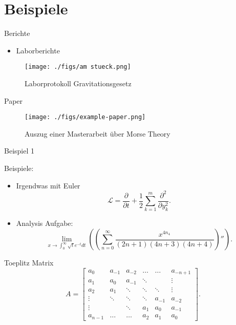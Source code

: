 \section{Beispiele}
\begin{frame}{Berichte}
    \begin{itemize}
        \item Laborberichte 
    \end{itemize}
    \begin{figure}[htpb]
        \centering
        \texttt{[image: ./figs/am stueck.png]}
        \caption{Laborprotokoll Gravitationsgesetz}
        \label{fig:labor}
    \end{figure}
\end{frame}



\begin{frame}{Paper}
    \begin{figure}[htpb]
        \centering
        \texttt{[image: ./figs/example-paper.png]}
        \caption{Auszug einer Masterarbeit \"uber Morse Theory}
    \end{figure}
\end{frame}


\begin{frame}{Beispiel 1}


Beispiele:
\begin{itemize}
    \item Irgendwas mit Euler \cite{baranek2023randomized}
        \[ \mathcal{L} = \frac{\partial}{\partial t}+ \frac{1}{2}\sum_{k=1}^{m}\frac{\partial^2}{\partial y_{k}^2} .\] 
\end{itemize}


\begin{itemize}
    \item Analysis Aufgabe: 
        \[ \lim_{x\to \int_0^{\infty} \sqrt{t}e^{-t}dt}\left( \left( \sum_{n=0}^{\infty}\frac{x^{4n_4}}{(2n+1)(4n+3)(4n+4)} \right)''  \right) .\] 
\end{itemize}
\end{frame}

    



\begin{frame}{Toeplitz Matrix}
    \[ A=\begin{bmatrix}
            a_0 & a_{-1} & a_{-2} & \ldots & \ldots  &a_{-n+1}  \\
            a_1 & a_0  & a_{-1} &  \ddots   &  &  \vdots \\
            a_2 & a_1 & \ddots  & \ddots & \ddots& \vdots \\ 
            \vdots &  \ddots & \ddots &   \ddots  & a_{-1} & a_{-2}\\
            \vdots &         & \ddots & a_1 & a_0 &  a_{-1} \\
            a_{n-1} &  \ldots & \ldots & a_2 & a_1 & a_0
        \end{bmatrix} .\] 
\end{frame}



